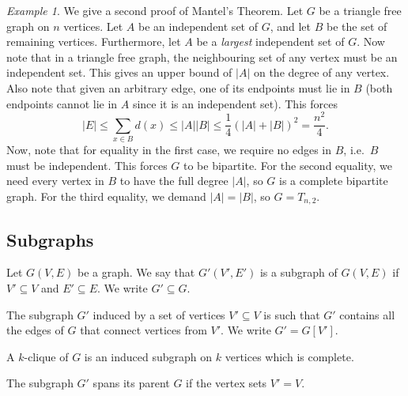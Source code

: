 \documentclass[11pt]{article}
\theoremstyle{definition}
\theoremstyle{remark}
\newtheorem*{example}{Example}
\numberwithin{equation}{section}
\begin{document}
    \begin{example}
        We give a second proof of Mantel's Theorem. Let $G$ be a triangle free graph
        on $n$ vertices. Let $A$ be an independent set of $G$, and let $B$ be the set
        of remaining vertices. Furthermore, let $A$ be a \emph{largest} independent
        set of $G$. Now note that in a triangle free graph, the neighbouring set of
        any vertex must be an independent set. This gives an upper bound of $|A|$ on
        the degree of any vertex. Also note that given an arbitrary edge, one of its
        endpoints must lie in $B$ (both endpoints cannot lie in $A$ since it is an
        independent set). This forces \[
            |E| \leq \sum_{x \in B} d(x) \leq |A| |B| \leq \frac{1}{4}(|A| + |B|)^2 =
            \frac{n^2}{4}.
        \] 
        Now, note that for equality in the first case, we require no edges in $B$,
        i.e.\ $B$ must be independent. This forces $G$ to be bipartite. For the
        second equality, we need every vertex in $B$ to have the full degree $|A|$,
        so $G$ is a complete bipartite graph. For the third equality, we demand $|A|
        = |B|$, so $G = T_{n, 2}$.
    \end{example}

    \subsection{Subgraphs}
    \begin{definition}
        Let $G(V, E)$ be a graph. We say that $G'(V', E')$ is a subgraph of $G(V, E)$
        if $V' \subseteq V$ and $E' \subseteq E$. We write $G' \subseteq G$.
    \end{definition}

    \begin{definition}
        The subgraph $G'$ induced by a set of vertices $V' \subseteq V$ is such that
        $G'$ contains all the edges of $G$ that connect vertices from $V'$. We write
        $G' = G[V']$.
    \end{definition}

    \begin{definition}
        A $k$-clique of $G$ is an induced subgraph on $k$ vertices which is complete.
    \end{definition}

    \begin{definition}
        The subgraph $G'$ spans its parent $G$ if the vertex sets $V' = V$.
    \end{definition}
\end{document}

